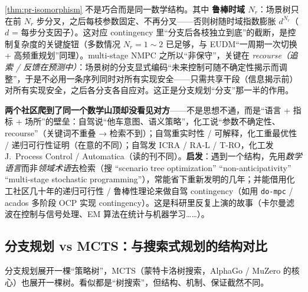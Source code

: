 \cref{thm:pr-isomorphism} 不是巧合而是同一数学结构。其中 \textbf{鲁棒时域 $N_r$}：场景树只在前 $N_r$ 步分叉，之后每枝参数固定、不再分叉——否则树随时域指数膨胀 $d^{N_r}$（$d$ = 每步分支因子）。这对应 contingency 里“分支后各枝独立到底”的截断，是控制复杂度的关键旋钮（多数情况 $N_r=1\sim2$ 已足够，与 EUDM“一周期一次切换 + 高频重规划”同理）。multi-stage NMPC 之所以“非保守”，关键在 \emph{recourse（追索 / 反馈在预测中）}：场景树的分支显式编码“未来控制可随不确定性揭示而调整”，于是不必用一条序列同时对所有实现安全——只需共享干段（信息揭示前）对所有实现安全，之后各分支各自应对。这正是分支规划“分支”那一半的作用。

\begin{insight}
\textbf{两个社区爬到了同一个数学山顶却没看见对方}——不是思想不通，而是“语言 + 指标 + 场所”的壁垒：自驾说“他车意图、语义策略”，化工说“参数不确定性、recourse”（关键词不重叠 → 检索不到）；自驾重实时性 / 可解释，化工重最优性 / 递归可行性证明（在意的不同）；自驾发 ICRA / RA-L / T-RO，化工发 J.\ Process Control / Automatica（读的刊不同）。\textbf{启发}：遇到一个结构，先用\emph{数学语言}而非\emph{领域术语}去检索（搜 “scenario tree optimization” “non-anticipativity” “multi-stage stochastic programming”），常能省下重新发明的几年；并能借用化工社区几十年的递归可行性 / 鲁棒性理论来做自驾 contingency（如用 \texttt{do-mpc} / acados 多阶段 OCP 实现 contingency）。这是科研里反复上演的故事（卡尔曼滤波在控制与信号处理、EM 算法在统计与机器学习……）。
\end{insight}

\subsection{分支规划 vs MCTS：与搜索式规划的结构对比}
\label{sec:pr-mcts}

分支规划展开一棵“策略树”，MCTS（蒙特卡洛树搜索，AlphaGo / MuZero 的核心）也展开一棵树。看似都是“树搜索”，但结构、机制、保证截然不同。

